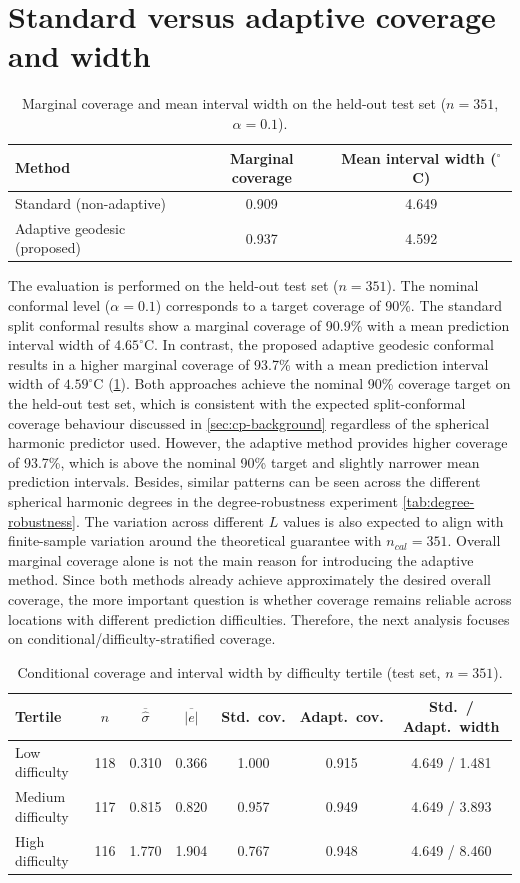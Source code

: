 \section{Standard versus adaptive coverage and width}
\label{sec:main-results}
\begin{table}[H]
\centering
\caption{Marginal coverage and mean interval width on the held-out test set ($n=351$, $\alpha=0.1$).}
\label{tab:main-coverage}
\begin{tabular}{lcc}
\toprule
Method & Marginal coverage & Mean interval width ($^\circ$C) \\
\midrule
Standard (non-adaptive) & 0.909 & 4.649 \\
Adaptive geodesic (proposed) & 0.937 & 4.592 \\
\bottomrule
\end{tabular}
\end{table}
The evaluation is performed on the held-out test set ($n=351$). The nominal conformal level ($\alpha=0.1$) corresponds to a target coverage of 90\%. The standard split conformal results show a marginal coverage of 90.9\% with a mean prediction interval width of $4.65^\circ\mathrm{C}$. In contrast, the proposed adaptive geodesic conformal results in a higher marginal coverage of 93.7\% with a mean prediction interval width of $4.59^\circ\mathrm{C}$ (\cref{tab:main-coverage}). Both approaches achieve the nominal 90\% coverage target on the held-out test set, which is consistent with the expected split-conformal coverage behaviour discussed in \cref{sec:cp-background} regardless of the spherical harmonic predictor used. However, the adaptive method provides higher coverage of 93.7\%, which is above the nominal 90\% target and slightly narrower mean prediction intervals. Besides, similar patterns can be seen across the different spherical harmonic degrees in the degree-robustness experiment \cref{tab:degree-robustness}. The variation across different $L$ values is also expected to align with finite-sample variation around the theoretical guarantee with $n_{cal}=351$. Overall marginal coverage alone is not the main reason for introducing the adaptive method. Since both methods already achieve approximately the desired overall coverage, the more important question is whether coverage remains reliable across locations with different prediction difficulties. Therefore, the next analysis focuses on conditional/difficulty-stratified coverage.
\begin{table}[H]
\centering
\caption{Conditional coverage and interval width by difficulty tertile (test set, $n=351$).}
\label{tab:tertile}
\begin{tabular}{lcccccc}
\toprule
Tertile & $n$ & $\overline{\hat\sigma}$ & $\overline{|e|}$ & Std.\ cov. & Adapt.\ cov. & Std.\ / Adapt.\ width \\
\midrule
Low difficulty & 118 & 0.310 & 0.366 & 1.000 & 0.915 & 4.649 / 1.481 \\
Medium difficulty & 117 & 0.815 & 0.820 & 0.957 & 0.949 & 4.649 / 3.893 \\
High difficulty & 116 & 1.770 & 1.904 & 0.767 & 0.948 & 4.649 / 8.460 \\
\bottomrule
\end{tabular}
\end{table}
